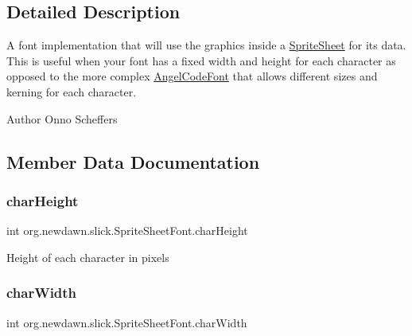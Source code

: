 \subsection{Detailed Description}
A font implementation that will use the graphics inside a \mbox{\hyperlink{classorg_1_1newdawn_1_1slick_1_1_sprite_sheet}{Sprite\+Sheet}} for its data. This is useful when your font has a fixed width and height for each character as opposed to the more complex \mbox{\hyperlink{classorg_1_1newdawn_1_1slick_1_1_angel_code_font}{Angel\+Code\+Font}} that allows different sizes and kerning for each character.

\begin{DoxyAuthor}{Author}
Onno Scheffers 
\end{DoxyAuthor}


\subsection{Member Data Documentation}
\mbox{\label{classorg_1_1newdawn_1_1slick_1_1_sprite_sheet_font_a89d0e271ee8a6fc3f71a210b68dd8fbe}} 
\subsubsection{\texorpdfstring{char\+Height}{charHeight}}
{\footnotesize\ttfamily int org.\+newdawn.\+slick.\+Sprite\+Sheet\+Font.\+char\+Height\hspace{0.3cm}{\ttfamily [private]}}

Height of each character in pixels \mbox{\label{classorg_1_1newdawn_1_1slick_1_1_sprite_sheet_font_ac38271d5994a8fb4bdf689b5ef968093}} 
\subsubsection{\texorpdfstring{char\+Width}{charWidth}}
{\footnotesize\ttfamily int org.\+newdawn.\+slick.\+Sprite\+Sheet\+Font.\+char\+Width\hspace{0.3cm}{\ttfamily [private]}}

